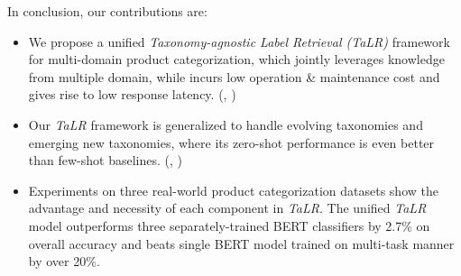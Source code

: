 In conclusion, our contributions are:
\begin{itemize}
    \item We propose a unified \textit{Taxonomy-agnostic Label Retrieval (TaLR)} framework for multi-domain product categorization, which jointly leverages knowledge from multiple domain, 
    while incurs low operation \& maintenance cost and gives rise to low response latency. (, )
    \item Our \textit{TaLR} framework is generalized to handle evolving taxonomies and emerging new taxonomies, 
    where its zero-shot performance is even better than few-shot baselines. (, )

    \item Experiments on three real-world product categorization datasets show the advantage and necessity of each component in \textit{TaLR}. The unified \textit{TaLR} model outperforms three separately-trained BERT classifiers by 2.7\% on overall accuracy and beats single BERT model trained on multi-task manner by over 20\%.
\end{itemize}